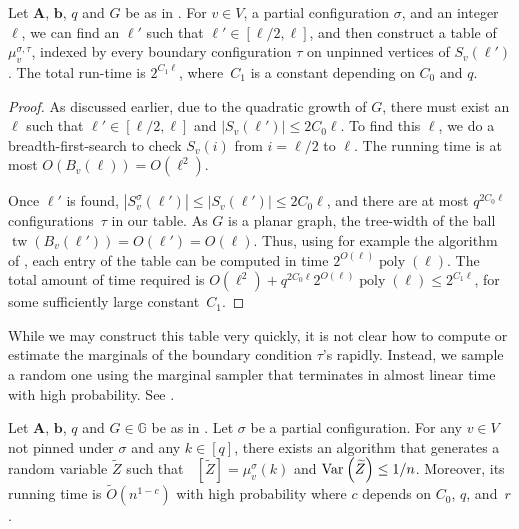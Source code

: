\documentclass{theoretics}
\newcommand{\tp}[1]{{\left( #1 \right)}}
\newcommand{\Ex}{\mathop{\mathbb{{}E}}\nolimits}
\def\=#1{\mathbb{#1}}
\newcommand{\poly}[1]{\ensuremath{\mathop{\mathrm{poly}}\tp{#1}}}
\newcommand{\abs}[1]{\ensuremath{\left\vert#1\right\vert}}
\newcommand{\Var}[2]{\ensuremath{\textnormal{Var}_{#1}\left(#2\right)}}
\newcommand{\tw}{\operatorname{tw}}
\begin{document}
\begin{lemma}\label{YZ-table}
  Let ${\mathbf{A}}$, ${\mathbf{b}}$, $q$ and $G$ be as in .
  For $v\in V$, a partial configuration $\sigma$, and an integer~$\ell$, 
  we can find an $\ell'$ such that $\ell'\in[\ell/2,\ell]$,
  and then construct a table of $\mu_v^{\sigma,\tau}$, indexed by every boundary configuration $\tau$ on unpinned vertices of $S_v(\ell')$.
  The total run-time is $2^{C_1\ell}$,
  where~$C_1$ is a constant depending on $C_0$ and $q$.
\end{lemma}

\begin{proof}
  As discussed earlier, due to the quadratic growth of $G$,
  there must exist an $\ell$ such that $\ell'\in[\ell/2,\ell]$ and $\abs{S_v(\ell')}\le 2C_0\ell$.
  To find this $\ell$,
  we do a breadth-first-search to check $S_v(i)$ from $i=\ell/2$ to $\ell$.
  The running time is at most $O(B_v(\ell))=O(\ell^2)$.

  Once $\ell'$ is found,
  $\abs{S^{\sigma}_v(\ell')}\le\abs{S_v(\ell')}\le 2C_0\ell$,
  and there are at most $q^{2C_0\ell}$ config\-urations~$\tau$ in our table.
  As $G$ is a planar graph, the tree-width of the ball $\tw(B_v(\ell'))=O(\ell')=O(\ell)$.
  Thus, using for example the algorithm of \cite{YZ13}, each entry of the table can be computed in time $2^{O(\ell)}\poly{\ell}$.
  The total amount of time required is $O(\ell^2)+q^{2C_0\ell}2^{O(\ell)}\poly{\ell}\le 2^{C_1\ell}$,
  for some sufficiently large constant~$C_1$.
\end{proof}

While we may construct this table very quickly,
it is not clear how to compute or estimate the marginals of the boundary condition $\tau$'s rapidly.
Instead, we sample a random one using the marginal sampler \cite{AJ22} that terminates in almost linear time with high probability. 
See . 

\begin{lemma}
	\label{lem:lattice-estimator}
    Let ${\mathbf{A}}$, ${\mathbf{b}}$, $q$ and $G\in\=G$ be as in .
    Let $\sigma$ be a partial configuration.
    For any $v\in V$ not pinned under $\sigma$ and any $k\in[q]$,
    there exists an algorithm that generates a random variable $\widetilde{Z}$ such that $\Ex[\widetilde{Z}]=\mu_{v}^{\sigma}(k)$ and $\Var{}{\widetilde{Z}}\leq1/n$.
    Moreover, its running time is $\widetilde{O}(n^{1-c})$ with high probability where $c$ depends on $C_0$, $q$, and~$r$.
\end{lemma}
\end{document}
